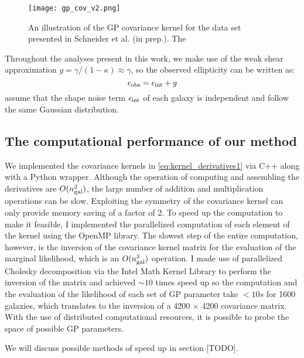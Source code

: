 \begin{figure}
	\centering
	\texttt{[image: gp\_cov\_v2.png]}
	\caption{An illustration of the GP covariance kernel for the data set
		presented in Schneider et al. (in prep.). The  
		\label{fig:GP_kernel_vis}}
\end{figure}




Throughout the analyses present in this work, 
we make use of the weak shear approximation 
$g = \gamma / (1 - \kappa)  \approx \gamma$, so the observed ellipticity can be
written as: 
\begin{equation}
	\epsilon_{\rm obs} = \epsilon_{\rm int} + g 
\end{equation}
assume that the shape noise term $\epsilon_{\rm int}$ of each galaxy is 
independent and follow the same Gaussian distribution.  

\subsection{The computational performance of our method}
We implemented the covariance kernels in \ref{eq:kernel_derivatives1}
via {\sc C++} along with a {\sc Python} wrapper. 
Although the operation of computing and assembling the
derivatives are $O(n_{\rm gal}^2)$, the large number of addition and 
multiplication operations can be slow.
Exploiting the symmetry of the covariance kernel can only provide 
memory saving of a factor of 2.
To speed up the computation to make it feasible, 
I implemented the parallelized computation of each element of the kernel using 
the {\sc OpenMP} library. The slowest step of the entire computation, however, 
is the inversion of the
covariance kernel matrix for the evaluation of the marginal likelihood, 
which is an $O(n_{\rm gal}^3)$ operation. 
I made use of parallelized Cholesky decomposition via the {\sc Intel Math
Kernel Library} to perform the inversion of the matrix and achieved $\sim10$ 
times speed up so the
computation and the evaluation of the likelihood of each set of GP parameter
take $< 10s$ for 1600 galaxies, which translates to 
the inversion of a 4200 $\times$ 4200 covariance matrix.
With the use of distributed computational resources, it is possible 
to probe the space of possible GP parameters.  


We will discuss possible methods
of speed up in section [TODO].

